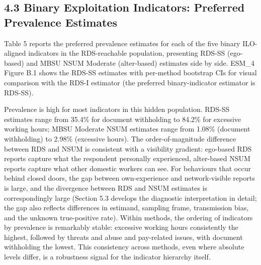 \documentclass[
  12pt,
  letterpaper,
  DIV=11,
  numbers=noendperiod]{scrartcl}
\begin{document}
\subsection{4.3 Binary Exploitation Indicators: Preferred Prevalence
Estimates}\label{binary-exploitation-indicators-preferred-prevalence-estimates}

Table 5 reports the preferred prevalence estimates for each of the five
binary ILO-aligned indicators in the RDS-reachable population,
presenting RDS-SS (ego-based) and MBSU NSUM Moderate (alter-based)
estimates side by side. ESM\_4 Figure B.1 shows the RDS-SS estimates
with per-method bootstrap CIs for visual comparison with the RDS-I
estimator (the preferred binary-indicator estimator is RDS-SS).

Prevalence is high for most indicators in this hidden population. RDS-SS
estimates range from 35.4\% for document withholding to 84.2\% for
excessive working hours; MBSU Moderate NSUM estimates range from 1.08\%
(document withholding) to 2.98\% (excessive hours). The
order-of-magnitude difference between RDS and NSUM is consistent with a
visibility gradient: ego-based RDS reports capture what the respondent
personally experienced, alter-based NSUM reports capture what other
domestic workers can see. For behaviours that occur behind closed doors,
the gap between own-experience and network-visible reports is large, and
the divergence between RDS and NSUM estimates is correspondingly large
(Section 5.3 develops the diagnostic interpretation in detail; the gap
also reflects differences in estimand, sampling frame, transmission
bias, and the unknown true-positive rate). Within methods, the ordering
of indicators by prevalence is remarkably stable: excessive working
hours consistently the highest, followed by threats and abuse and
pay-related issues, with document withholding the lowest. This
consistency across methods, even where absolute levels differ, is a
robustness signal for the indicator hierarchy itself.
\end{document}
